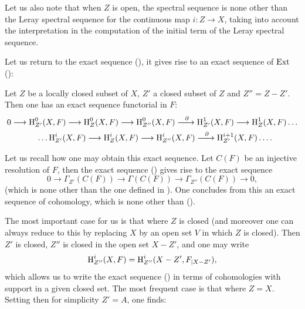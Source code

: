 Let us also note that when $Z$ is open, the spectral sequence  is none other than the Leray spectral sequence for the continuous map $i: Z \to X$, taking into account the interpretation  in the computation of the initial term of the Leray spectral sequence.

\bigskip Let us return to the exact sequence (), it gives rise to an exact sequence of $\operatorname{Ext}$ (\cf \cite{Tohoku}):

\begin{theorem} \label{I.2.8}
Let $Z$ be a locally closed subset of $X$, $Z'$ a closed subset of $Z$ and $Z''=Z-Z'$. Then one has an exact sequence functorial in $F$:
\begin{equation} \label{eq:I.24}
\begin{gathered}
0 \to \H_{Z'}^0(X, F) \to \H_Z^0(X, F) \to \H_{Z''}^0(X, F)\lto{\partial} \H^1_{Z'}(X, F) \to \H^1_Z(X, F) \dots \\
\phantom{0}\dots \H_{Z'}^i(X, F) \to \H_Z^i(X, F) \to \H_{Z''}^i(X, F)\lto{\partial} \H^{i+1}_{Z'}(X, F)\dots.
\end{gathered}
\end{equation}
\end{theorem}


Let us recall how one may obtain this exact sequence. Let $C(F)$ be an injective resolution of $F$, then the exact sequence () gives rise to the exact sequence
\begin{equation} \label{eq:I.25} {0 \to \Gamma_{Z'}(C(F)) \to \Gamma(C(F)) \to \Gamma_{Z''}(C(F)) \to 0},
\end{equation}
(which is none other than the one defined in ). One concludes from this an exact sequence of cohomology, which is none other than ().

The most important case for us is that where $Z$ is closed (and
moreover one can always reduce to this by replacing $X$ by
an open set $V$ in which $Z$ is closed). Then $Z'$ is closed,
$Z''$ is closed in the open set $X-Z'$, and one may write
\begin{equation} \label{eq:I.26} {\operatorname{H}^i_{Z''}(X, F)=\operatorname{H}^i_{Z''}(X-Z', F_{|X-Z'})},
\end{equation}
which allows us to write the exact sequence () in terms of cohomologies with support in a given closed set. The most frequent case is that where $Z=X$. Setting then for simplicity $Z'=A$, one finds:

